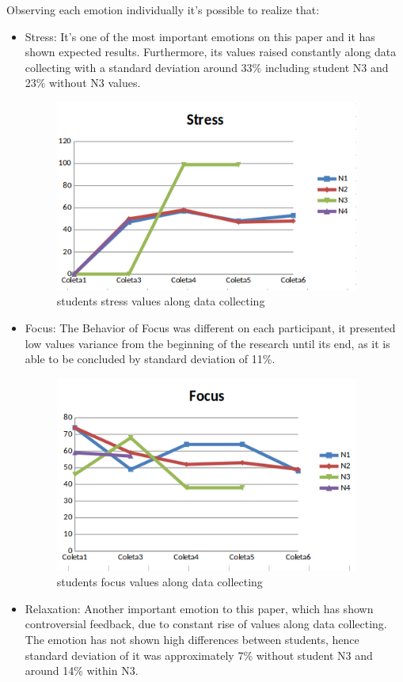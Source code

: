 \documentclass[12pt,openright,a4paper]{article}
\begin{document}
 Observing each emotion individually it’s possible to realize that:
 \begin{itemize}
 	\item Stress: It’s one of the most important emotions on this paper and it has shown expected results. Furthermore, its values raised constantly along data collecting with a standard deviation around 33\% including student N3 and 23\% without N3 values.
 	  \begin{figure}[H]
 	  	\centering
 	  	\includegraphics[width=10cm]{./stress.png}
 	  	\caption{students stress values along data collecting}
 	  \end{figure}
 	\item Focus: The Behavior of Focus was different on each participant, it presented low values variance from the beginning of the research until its end, as it is able to be concluded by standard deviation of 11\%. 
 	   \begin{figure}[H]
 	  	\centering
 	  	\includegraphics[width=10cm]{./focus.png}
 	  	\caption{students focus values along data collecting}
 	  \end{figure}
 	\item Relaxation: Another important emotion to this paper, which has shown controversial feedback, due to constant rise of values along data collecting. The emotion has not shown high differences between students, hence standard deviation of it was approximately 7\% without student N3 and around 14\% within N3.

\end{itemize}
\end{document}

